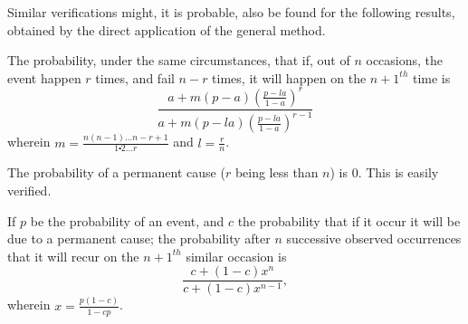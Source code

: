 \documentclass[oneside]{book}
\begin{document}
Similar verifications might, it is probable, also be found for
the following results, obtained by the direct application of the
general method.

The probability, under the same circumstances, that if, out of
$n$ occasions, the event happen $r$ times, and fail $n-r$ times, it will
happen on the ${n + 1}^{\mathit{th}}$ time is
\begin{equation*}
\frac{a+m(p-a )\left({\displaystyle \frac{p-la}{1-a}}\right)^r}
     {a+m(p-la)\left({\displaystyle \frac{p-la}{1-a}}\right)^{r-1}}
\end{equation*}
wherein $m=\displaystyle \frac{n(n-1)\dotsc n-r+1}{1 \centerdot 2 \dotsc r}$ and $\displaystyle l=\frac{r}{n}$.

The probability of a permanent cause ($r$ being less than $n$)
is 0. This is easily verified.

If $p$ be the probability of an event, and $c$ the probability that
if it occur it will be due to a permanent cause; the probability
after $n$ successive observed occurrences that it will recur on the
${n + 1}^{\mathit{th}}$ similar occasion is
\begin{equation*}
\frac{c+(1-c)x^n}{c+(1-c)x^{n-1}},
\end{equation*}
wherein $\displaystyle x = \frac{p(1-c)}{1-cp}$.
\end{document}
